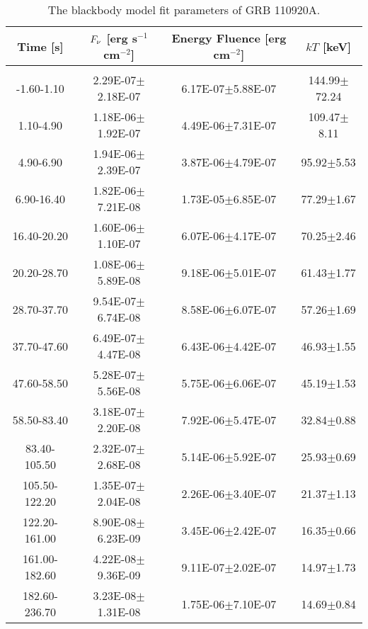 \begin{table}[h]
\centering
\scriptsize
\label{tab:}
\begin{tabular}{c| c c c}
Time [s] & $F_{\nu}$ [erg s$^{-1}$ cm$^{-2}$] & Energy Fluence [erg cm$^{-2}$] & $kT$ [keV] \\
\hline \hline\\ 

-1.60-1.10 & 2.29E-07$\pm$2.18E-07 & 6.17E-07$\pm$5.88E-07 & 144.99$\pm$72.24 \\ 

1.10-4.90 & 1.18E-06$\pm$1.92E-07 & 4.49E-06$\pm$7.31E-07 & 109.47$\pm$8.11 \\ 

4.90-6.90 & 1.94E-06$\pm$2.39E-07 & 3.87E-06$\pm$4.79E-07 & 95.92$\pm$5.53 \\ 

6.90-16.40 & 1.82E-06$\pm$7.21E-08 & 1.73E-05$\pm$6.85E-07 & 77.29$\pm$1.67 \\ 

16.40-20.20 & 1.60E-06$\pm$1.10E-07 & 6.07E-06$\pm$4.17E-07 & 70.25$\pm$2.46 \\ 

20.20-28.70 & 1.08E-06$\pm$5.89E-08 & 9.18E-06$\pm$5.01E-07 & 61.43$\pm$1.77 \\ 

28.70-37.70 & 9.54E-07$\pm$6.74E-08 & 8.58E-06$\pm$6.07E-07 & 57.26$\pm$1.69 \\ 

37.70-47.60 & 6.49E-07$\pm$4.47E-08 & 6.43E-06$\pm$4.42E-07 & 46.93$\pm$1.55 \\ 

47.60-58.50 & 5.28E-07$\pm$5.56E-08 & 5.75E-06$\pm$6.06E-07 & 45.19$\pm$1.53 \\ 

58.50-83.40 & 3.18E-07$\pm$2.20E-08 & 7.92E-06$\pm$5.47E-07 & 32.84$\pm$0.88 \\ 

83.40-105.50 & 2.32E-07$\pm$2.68E-08 & 5.14E-06$\pm$5.92E-07 & 25.93$\pm$0.69 \\ 

105.50-122.20 & 1.35E-07$\pm$2.04E-08 & 2.26E-06$\pm$3.40E-07 & 21.37$\pm$1.13 \\ 

122.20-161.00 & 8.90E-08$\pm$6.23E-09 & 3.45E-06$\pm$2.42E-07 & 16.35$\pm$0.66 \\ 

161.00-182.60 & 4.22E-08$\pm$9.36E-09 & 9.11E-07$\pm$2.02E-07 & 14.97$\pm$1.73 \\ 

182.60-236.70 & 3.23E-08$\pm$1.31E-08 & 1.75E-06$\pm$7.10E-07 & 14.69$\pm$0.84 \\ 

\end{tabular}
\caption{The blackbody model fit parameters of GRB 110920A.}
\end{table}


